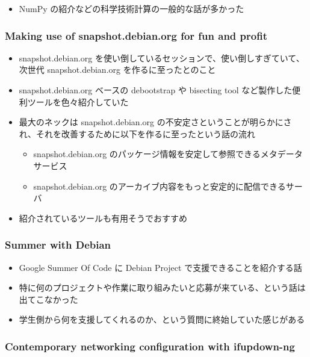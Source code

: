 \documentclass[mingoth,a4paper]{jsarticle}
\begin{document}
\begin{itemize}
\item NumPy の紹介などの科学技術計算の一般的な話が多かった
\end{itemize}

\subsubsection{Making use of snapshot.debian.org for fun and profit}

\begin{itemize}
\item snapshot.debian.org を使い倒しているセッションで、使い倒しすぎていて、次世代 snapshot.debian.org を作るに至ったとのこと
\item snapshot.debian.org ベースの debootstrap や bisecting tool など製作した便利ツールを色々紹介していた
  \item 最大のネックは snapshot.debian.org の不安定さということが明らかにされ、それを改善するために以下を作るに至ったという話の流れ
  \begin{itemize}
  \item snapshot.debian.org のパッケージ情報を安定して参照できるメタデータサービス
  \item snapshot.debian.org のアーカイブ内容をもっと安定的に配信できるサーバ
  \end{itemize}
\item 紹介されているツールも有用そうでおすすめ
\end{itemize}

\subsubsection{Summer with Debian}

\begin{itemize}
\item Google Summer Of Code に Debian Project で支援できることを紹介する話
\item 特に何のプロジェクトや作業に取り組みたいと応募が来ている、という話は出てこなかった
\item 学生側から何を支援してくれるのか、という質問に終始していた感じがある
\end{itemize}

\subsubsection{Contemporary networking configuration with ifupdown-ng}
\end{document}
